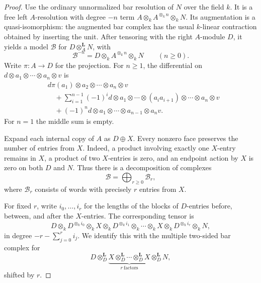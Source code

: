 \documentclass[11pt]{article}
\numberwithin{equation}{section}
\theoremstyle{definition}
\theoremstyle{remark}
\newcommand{\otL}{\otimes^{\mathbf L}}
\begin{document}
\begin{proof}
Use the ordinary unnormalized bar resolution of \(N\) over
the field \(k\).  It is a free left \(A\)-resolution with
degree \(-n\) term \(A\otimes_k A^{\otimes_k n}\otimes_k N\).
Its augmentation is a quasi-isomorphism: the augmented
bar complex has the usual \(k\)-linear contraction obtained
by inserting the unit.  After tensoring with the right
\(A\)-module \(D\), it yields a model \(\mathcal B\) for
\(D\otL_AN\), with
\[
\mathcal B^{-n}=D\otimes_k A^{\otimes_k n}\otimes_k N
\qquad(n\ge0).
\]
Write $\pi:A\to D$ for the projection. For $n\ge1$, the
differential on $d\otimes a_1\otimes\cdots\otimes a_n\otimes v$ is
\begin{align*}
 &d\pi(a_1)\otimes a_2\otimes\cdots\otimes a_n\otimes v\\
 &\quad+\sum_{i=1}^{n-1}(-1)^i
 d\otimes a_1\otimes\cdots\otimes(a_i a_{i+1})
       \otimes\cdots\otimes a_n\otimes v\\
 &\quad+(-1)^n d\otimes a_1\otimes\cdots\otimes a_{n-1}
       \otimes a_nv .
\end{align*}
For $n=1$ the middle sum is empty.

Expand each internal copy of \(A\) as \(D\oplus X\).
Every nonzero face preserves the number of entries from
\(X\).  Indeed, a product involving exactly one \(X\)-entry
remains in \(X\), a product of two \(X\)-entries is zero,
and an endpoint action by \(X\) is zero on both \(D\) and
\(N\). Thus there is a decomposition of complexes
\[
\mathcal B=\bigoplus_{r\ge0}\mathcal B_r,
\]
where \(\mathcal B_r\) consists of words with precisely
\(r\) entries from \(X\).

For fixed \(r\), write \(i_0,\ldots,i_r\) for the lengths
of the blocks of \(D\)-entries before, between, and after
the \(X\)-entries.  The corresponding tensor is
\begin{equation}
\label{eq:bar-block}
D\otimes_kD^{\otimes_k i_0}\otimes_k X
\otimes_kD^{\otimes_k i_1}\otimes_k\cdots
\otimes_k X\otimes_kD^{\otimes_k i_r}\otimes_k N,
\end{equation}
in degree \(-r-\sum_{j=0}^r i_j\).
We identify this with the multiple two-sided bar complex
for
\begin{equation}
\label{eq:derived-multibar}
D\otL_D
\underbrace{X\otL_D\cdots\otL_D X}_{r\ \text{factors}}
\otL_D N,
\end{equation}
shifted by \(r\).


\end{proof}
\end{document}
